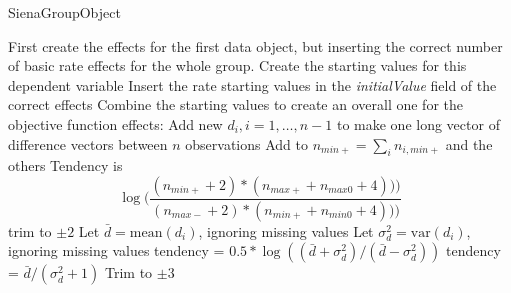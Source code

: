 \documentclass[12pt,a4paper]{article}
\makeatletter
\renewcommand{\=}{\,=\,}
\newcommand{\+}{\,+\,}
\newcommand{\nnm}[1]{\textsf{\small\textit{#1}}}
\renewcommand{\subsection}{\@startsection{subsection}{2}
                {0pt}{0.7\baselineskip}{0.3\baselineskip}
                {\sffamily} }
\makeatother
\begin{document}
 \subsection{SienaGroupObject}
 \begin{algorithmic}
 \STATE First create the effects for the first data object, but inserting the
 correct number of basic rate effects for the whole group.
 \STATE Create the starting values for this dependent variable
 \STATE Insert the rate starting values in the \nnm{initialValue} field of the
 correct effects
 \STATE Combine the starting values to create an overall one for the objective
 function effects:
 \STATE Add new $d_i, i=1,\ldots,n-1$ to make one long vector of
 difference vectors between $n$ observations
 \STATE Add to $n_{min+} = \sum_i n_{i,min+}$ and the others
 \STATE Tendency is
 $$  \log(\frac{(n_{min+} + 2 ) * (n_{max+} + n_{max0} + 4)))}
 {(n_{max-} + 2 ) * (n_{min+} + n_{min0} + 4)))}
 $$
 \STATE trim to $\pm 2$
 \ENDIF
 \STATE Let $\bar{d} = \mathrm{mean}(d_i)$, ignoring missing values
 \STATE Let $\sigma_d^2 = \mathrm{var} (d_i)$, ignoring missing values
 \STATE tendency = $0.5 * \log((\bar{d} + \sigma_d^2)/(\bar{d} - \sigma_d^2))$
 \ELSE
 \STATE tendency = $\bar{d} /(\sigma_d^2+ 1)$
 \ENDIF
 \STATE Trim to $\pm 3$
 \ENDIF
 \ENDIF
{}
\STATE
\ELSE[bipartite]
\STATE
\ENDIF
 \ENDFOR
 \ENDFOR
\end{algorithmic}
\end{document}
